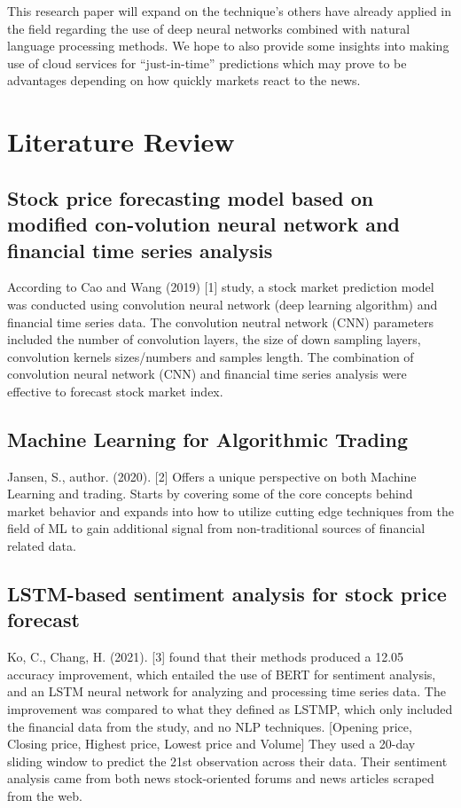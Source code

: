\documentclass{llncs}
\begin{document}
This research paper will expand on the technique's others have already applied in the field regarding the use of deep neural networks combined with natural language processing methods. We hope to also provide some insights into making use of cloud services for “just-in-time” predictions which may prove to be advantages depending on how quickly markets react to the news.


\section{Literature Review}

\subsection{Stock  price  forecasting  model  based  on  modified  con-volution neural network and financial time series analysis}

According to Cao and Wang (2019) [1] study, a stock market prediction model was conducted using convolution neural network (deep learning algorithm) and financial time series data. The convolution neutral network (CNN) parameters included the number of convolution layers, the size of down sampling layers, convolution kernels sizes/numbers and samples length. The combination of convolution neural network (CNN) and financial time series analysis were effective to forecast stock market index.


\subsection{Machine  Learning  for  Algorithmic  Trading}

Jansen, S., author. (2020). [2] Offers a unique perspective on both Machine Learning and trading. Starts by covering some of the core concepts behind market behavior and expands into how to utilize cutting edge techniques from the field of ML to gain additional signal from non-traditional sources of financial related data.

\subsection{LSTM-based sentiment analysis for stock price forecast}
Ko, C., Chang, H. (2021). [3] found that their methods produced a 12.05 accuracy improvement, which entailed the use of BERT for sentiment analysis, and an LSTM neural network for analyzing and processing time series data. The improvement was compared to what they defined as LSTMP, which only included the financial data from the study, and no NLP techniques. [Opening price, Closing price, Highest price, Lowest price and Volume] They used a 20-day sliding window to predict the 21st observation across their data. Their sentiment analysis came from both news stock-oriented forums and news articles scraped from the web.
\end{document}

